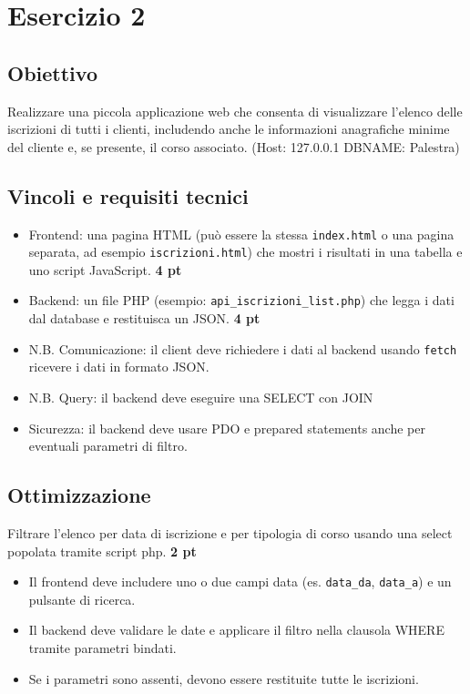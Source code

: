 \documentclass[a4paper,12pt]{article}
\begin{document}
	
	\section*{Esercizio 2}
	
	\subsection*{Obiettivo}
	
	Realizzare una piccola applicazione web che consenta di visualizzare l'elenco delle iscrizioni di tutti i clienti, includendo anche le informazioni anagrafiche minime del cliente e, se presente, il corso associato. (Host: 127.0.0.1  DBNAME: Palestra)
	
	\subsection*{Vincoli e requisiti tecnici}
	
	\begin{itemize}
		\item Frontend: una pagina HTML (può essere la stessa \texttt{index.html} o una pagina separata, ad esempio \texttt{iscrizioni.html}) che mostri i risultati in una tabella e uno script JavaScript.  \textbf{4 pt}
		\item Backend: un file PHP (esempio: \texttt{api\_iscrizioni\_list.php}) che legga i dati dal database e restituisca un JSON. \textbf{4 pt}
		\item N.B. Comunicazione: il client deve richiedere i dati al backend usando \texttt{fetch}  ricevere i dati in formato JSON.
		\item N.B. Query: il backend deve eseguire una SELECT con JOIN
		\item Sicurezza: il backend deve usare PDO e prepared statements anche per eventuali parametri di filtro.
	\end{itemize}
	
	\subsection*{Ottimizzazione}
	
	Filtrare l'elenco per data di iscrizione e per tipologia di corso usando una select popolata tramite script php. \textbf{2 pt}
	
	\begin{itemize}
		\item Il frontend deve includere uno o due campi data (es. \texttt{data\_da}, \texttt{data\_a}) e un pulsante di ricerca.
		\item Il backend deve validare le date e applicare il filtro nella clausola WHERE tramite parametri bindati.
		\item Se i parametri sono assenti, devono essere restituite tutte le iscrizioni.
	\end{itemize}
	
\end{document}
